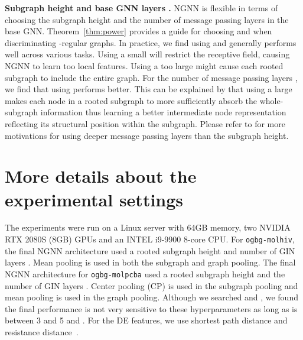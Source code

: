 \documentclass{article}
\begin{document}
\textbf{Subgraph height  and base GNN layers .}
NGNN is flexible in terms of choosing the subgraph height  and the number of message passing layers  in the base GNN. Theorem~\ref{thm:power} provides a guide for choosing  and  when discriminating -regular graphs. In practice, we find using  and  generally performs well across various tasks. Using a small  will restrict the receptive field, causing NGNN to learn too local features. Using a too large  might cause each rooted subgraph to include the entire graph. For the number of message passing layers , we find that using  performs better. This can be explained by that using a large  makes each node in a rooted subgraph to more sufficiently absorb the whole-subgraph information thus learning a better intermediate node representation reflecting its structural position within the subgraph. Please refer to \citep{zeng2020deep} for more motivations for using deeper message passing layers than the subgraph height.

















\section{More details about the experimental settings}\label{appendix:hyper}
The experiments were run on a Linux server with 64GB memory, two NVIDIA RTX 2080S (8GB) GPUs and an INTEL i9-9900 8-core CPU. For \texttt{ogbg-molhiv}, the final NGNN architecture used a rooted subgraph height  and number of GIN layers . Mean pooling is used in both the subgraph and graph pooling. The final NGNN architecture for \texttt{ogbg-molpcba} used a rooted subgraph height  and the number of GIN layers . Center pooling (CP) is used in the subgraph pooling and mean pooling is used in the graph pooling. Although we searched  and , we found the final performance is not very sensitive to these hyperparameters as long as  is between 3 and 5 and . For the DE features, we use shortest path distance and resistance distance~\citep{klein1993resistance}. 
\end{document}
